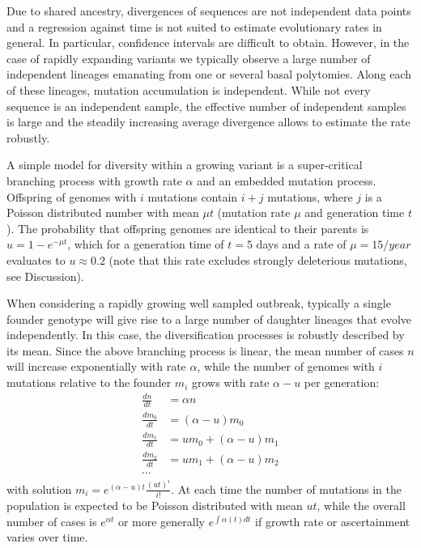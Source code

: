 \documentclass[aps,rmp, twocolumn]{revtex4}
\begin{document}
Due to shared ancestry, divergences of sequences are not independent data points and a regression against time is not suited to estimate evolutionary rates in general.
In particular, confidence intervals are difficult to obtain.
However, in the case of rapidly expanding variants we typically observe a large number of independent lineages emanating from one or several basal polytomies.
Along each of these lineages, mutation accumulation is independent.
While not every sequence is an independent sample, the effective number of independent samples is large and the steadily increasing average divergence allows to estimate the rate robustly.

A simple model for diversity within a growing variant is a super-critical branching process with growth rate $\alpha$ and an embedded mutation process.
Offspring of genomes with $i$ mutations contain $i+j$ mutations, where $j$ is a Poisson distributed number with mean $\mu t$ (mutation rate $\mu$ and generation time $t$).
The probability that offspring genomes are identical to their parents is $u = 1-e^{-\mu t}$, which for a generation time of $t=5$ days and a rate of $\mu = 15/year$ evaluates to $u\approx 0.2$ (note that this rate excludes strongly deleterious mutations, see Discussion).

When considering a rapidly growing well sampled outbreak, typically a single founder genotype will give rise to a large number of daughter lineages that evolve independently.
In this case, the diversification processes is robustly described by its mean.
Since the above branching process is linear, the mean number of cases $n$ will increase exponentially with rate $\alpha$, while the number of genomes with $i$ mutations relative to the founder $m_i$ grows with rate $\alpha - u$ per generation:
\begin{equation}
    \begin{split}
        \frac{dn}{dt} &= \alpha n \\
        \frac{dm_0}{dt} &= (\alpha - u) m_0 \\
        \frac{dm_1}{dt} &= u m_0 + (\alpha - u) m_1 \\
        \frac{dm_2}{dt} &= u m_1 + (\alpha - u) m_2 \\
        \cdots
    \end{split}
\end{equation}
with solution $m_i = e^{(\alpha - u)t} \frac{(ut)^i}{i!}$.
At each time the number of mutations in the population is expected to be Poisson distributed with mean $ut$, while the overall number of cases is $e^{\alpha t}$ or more generally $e^{\int \alpha(t) dt}$ if growth rate or ascertainment varies over time.
\end{document}
